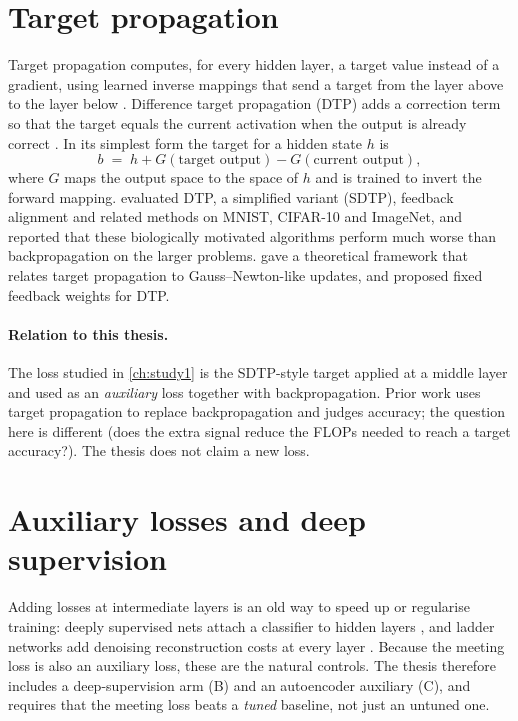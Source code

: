 \section{Target propagation}
Target propagation computes, for every hidden layer, a target value instead of a gradient, using learned inverse mappings that send a target from the layer above to the layer below \citep{bengio2014auto}. Difference target propagation (DTP) adds a correction term so that the target equals the current activation when the output is already correct \citep{lee2015dtp}. In its simplest form the target for a hidden state $h$ is
\begin{equation}
b \;=\; h + G(\text{target output}) - G(\text{current output}),
\end{equation}
where $G$ maps the output space to the space of $h$ and is trained to invert the forward mapping. \citet{bartunov2018assessing} evaluated DTP, a simplified variant (SDTP), feedback alignment and related methods on MNIST, CIFAR-10 and ImageNet, and reported that these biologically motivated algorithms perform much worse than backpropagation on the larger problems. \citet{meulemans2020theoretical} gave a theoretical framework that relates target propagation to Gauss--Newton-like updates, and \citet{shibuya2023fixed} proposed fixed feedback weights for DTP.

\paragraph{Relation to this thesis.} The loss studied in \cref{ch:study1} is the SDTP-style target applied at a middle layer and used as an \emph{auxiliary} loss together with backpropagation. Prior work uses target propagation to replace backpropagation and judges accuracy; the question here is different (does the extra signal reduce the FLOPs needed to reach a target accuracy?). The thesis does not claim a new loss.

\section{Auxiliary losses and deep supervision}
Adding losses at intermediate layers is an old way to speed up or regularise training: deeply supervised nets attach a classifier to hidden layers \citep{lee2015deeply}, and ladder networks add denoising reconstruction costs at every layer \citep{rasmus2015semi}. Because the meeting loss is also an auxiliary loss, these are the natural controls. The thesis therefore includes a deep-supervision arm (B) and an autoencoder auxiliary (C), and requires that the meeting loss beats a \emph{tuned} baseline, not just an untuned one.

